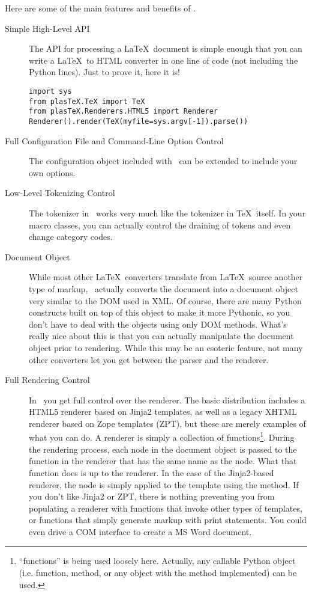 Here are some of the main features and benefits of \plasTeX.
\begin{description}
\item[Simple High-Level API] The API for processing a \LaTeX\ document
is simple enough that you can write a \LaTeX\ to HTML converter
in one line of code (not including the Python  lines).
Just to prove it, here it is!
\begin{verbatim}
import sys
from plasTeX.TeX import TeX
from plasTeX.Renderers.HTML5 import Renderer
Renderer().render(TeX(myfile=sys.argv[-1]).parse())
\end{verbatim}

\item[Full Configuration File and Command-Line Option Control]
The configuration object included with \plasTeX\ can be extended to include
your own options.

\item[Low-Level Tokenizing Control] The tokenizer in \plasTeX\ works very 
much like the tokenizer in \TeX\ itself.  In your macro classes, you 
can actually control the draining of tokens and even change category codes.

\item[Document Object] While most other \LaTeX\ converters translate from
\LaTeX\ source another type of markup, \plasTeX\ actually converts the 
document into a document object very similar to the DOM used in XML.
Of course, there are many Python constructs built on top of this object
to make it more Pythonic, so you don't have to deal with the objects using
only DOM methods. What's really nice about this is that you can actually 
manipulate the document object prior to rendering.  While this may be an
esoteric feature, not many other converters let you get between the parser
and the renderer.

\item[Full Rendering Control] In \plasTeX\, you get full control over the
renderer. The basic distribution includes a HTML5 renderer based on Jinja2
templates, as well as a legacy XHTML renderer based on Zope templates (ZPT), 
but these are merely examples of what you can do.
A renderer is simply a collection of functions\footnote{``functions'' is being
used loosely here.  Actually, any callable Python object (i.e. function, method, 
or any object with the  method implemented) can be used.}.  
During the rendering
process, each node in the document object is passed to the function
in the renderer that has the same name as the node.  What that function
does is up to the renderer.  In the case of the Jinja2-based renderer, the 
node is simply applied to the template using the  method.
If you don't like Jinja2 or ZPT, there is nothing preventing you from populating
a renderer with functions that invoke other types of templates, or functions
that simply generate markup with print statements.  You could even drive
a COM interface to create a MS Word document.
\end{description}
